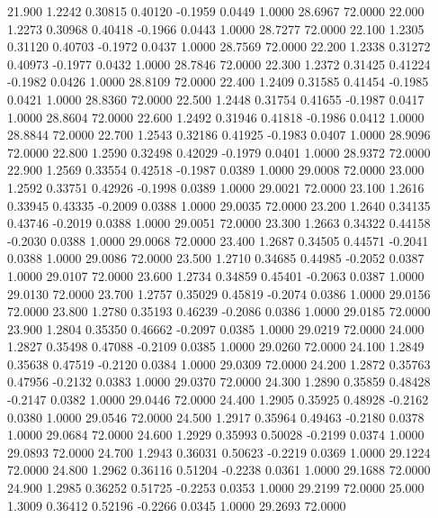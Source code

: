   21.900   1.2242   0.30815   0.40120  -0.1959   0.0449   1.0000  28.6967  72.0000
  22.000   1.2273   0.30968   0.40418  -0.1966   0.0443   1.0000  28.7277  72.0000
  22.100   1.2305   0.31120   0.40703  -0.1972   0.0437   1.0000  28.7569  72.0000
  22.200   1.2338   0.31272   0.40973  -0.1977   0.0432   1.0000  28.7846  72.0000
  22.300   1.2372   0.31425   0.41224  -0.1982   0.0426   1.0000  28.8109  72.0000
  22.400   1.2409   0.31585   0.41454  -0.1985   0.0421   1.0000  28.8360  72.0000
  22.500   1.2448   0.31754   0.41655  -0.1987   0.0417   1.0000  28.8604  72.0000
  22.600   1.2492   0.31946   0.41818  -0.1986   0.0412   1.0000  28.8844  72.0000
  22.700   1.2543   0.32186   0.41925  -0.1983   0.0407   1.0000  28.9096  72.0000
  22.800   1.2590   0.32498   0.42029  -0.1979   0.0401   1.0000  28.9372  72.0000
  22.900   1.2569   0.33554   0.42518  -0.1987   0.0389   1.0000  29.0008  72.0000
  23.000   1.2592   0.33751   0.42926  -0.1998   0.0389   1.0000  29.0021  72.0000
  23.100   1.2616   0.33945   0.43335  -0.2009   0.0388   1.0000  29.0035  72.0000
  23.200   1.2640   0.34135   0.43746  -0.2019   0.0388   1.0000  29.0051  72.0000
  23.300   1.2663   0.34322   0.44158  -0.2030   0.0388   1.0000  29.0068  72.0000
  23.400   1.2687   0.34505   0.44571  -0.2041   0.0388   1.0000  29.0086  72.0000
  23.500   1.2710   0.34685   0.44985  -0.2052   0.0387   1.0000  29.0107  72.0000
  23.600   1.2734   0.34859   0.45401  -0.2063   0.0387   1.0000  29.0130  72.0000
  23.700   1.2757   0.35029   0.45819  -0.2074   0.0386   1.0000  29.0156  72.0000
  23.800   1.2780   0.35193   0.46239  -0.2086   0.0386   1.0000  29.0185  72.0000
  23.900   1.2804   0.35350   0.46662  -0.2097   0.0385   1.0000  29.0219  72.0000
  24.000   1.2827   0.35498   0.47088  -0.2109   0.0385   1.0000  29.0260  72.0000
  24.100   1.2849   0.35638   0.47519  -0.2120   0.0384   1.0000  29.0309  72.0000
  24.200   1.2872   0.35763   0.47956  -0.2132   0.0383   1.0000  29.0370  72.0000
  24.300   1.2890   0.35859   0.48428  -0.2147   0.0382   1.0000  29.0446  72.0000
  24.400   1.2905   0.35925   0.48928  -0.2162   0.0380   1.0000  29.0546  72.0000
  24.500   1.2917   0.35964   0.49463  -0.2180   0.0378   1.0000  29.0684  72.0000
  24.600   1.2929   0.35993   0.50028  -0.2199   0.0374   1.0000  29.0893  72.0000
  24.700   1.2943   0.36031   0.50623  -0.2219   0.0369   1.0000  29.1224  72.0000
  24.800   1.2962   0.36116   0.51204  -0.2238   0.0361   1.0000  29.1688  72.0000
  24.900   1.2985   0.36252   0.51725  -0.2253   0.0353   1.0000  29.2199  72.0000
  25.000   1.3009   0.36412   0.52196  -0.2266   0.0345   1.0000  29.2693  72.0000
